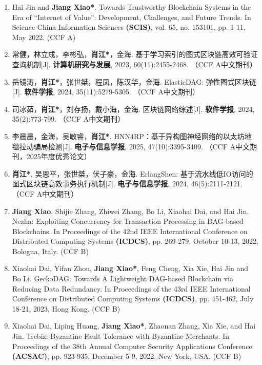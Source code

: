{\begin{enumerate}[itemsep=0pt, topsep=0pt, parsep=0pt]
    \item Hai Jin and \textbf{Jiang Xiao*}. Towards Trustworthy Blockchain Systems in the Era of ``Internet of Value'': Development, Challenges, and Future Trends. In Science China Information Sciences \textbf{(SCIS)}, vol. 65, no. 153101, pp. 1-11, May 2022. (CCF A)

    \item 常健，林立成，李彬弘，\textbf{肖江*}，金海. 基于学习索引的图式区块链高效可验证查询机制[J]. \textbf{计算机研究与发展}, 2023, 60(11):2455-2468. （CCF A中文期刊）

    \item 岳镜涛，\textbf{肖江*}，张世桀，程凤，陈汉华，金海. ElasticDAG: 弹性图式区块链[J]. \textbf{软件学报}, 2024, 35(11):5279-5305. （CCF A中文期刊）

    \item 司冰茹，\textbf{肖江*}，刘存扬，戴小海，金海. 区块链网络综述[J]. \textbf{软件学报}, 2024, 35(2):773-799. （CCF A中文期刊）

    \item 李晨晨，金海，吴敏睿，\textbf{肖江*}. HNN4RP：基于异构图神经网络的以太坊地毯拉动骗局检测[J]. \textbf{电子与信息学报}, 2025, 47(10):3395-3409. （CCF A中文期刊，2025年度优秀论文）

    \item \textbf{肖江*}, 吴恩平，张世桀，伏子豪，金海. ErlangShen: 基于流水线低IO访问的图式区块链高效事务执行机制[J]. \textbf{电子与信息学报}, 2024, 46(5):2111-2121. （CCF A中文期刊）

    \item \textbf{Jiang Xiao}, Shijie Zhang, Zhiwei Zhang, Bo Li, Xiaohai Dai, and Hai Jin. Nezha: Exploiting Concurrency for Transaction Processing in DAG-based Blockchains. In Proceedings of the 42nd IEEE International Conference on Distributed Computing Systems \textbf{(ICDCS)}, pp. 269-279, October 10-13, 2022, Bologna, Italy. (CCF B)

    \item Xiaohai Dai, Yifan Zhou, \textbf{Jiang Xiao*}, Feng Cheng, Xia Xie, Hai Jin and Bo Li. GeckoDAG: Towards A Lightweight DAG-based Blockchain via Reducing Data Redundancy. In Proceedings of the 43rd IEEE International Conference on Distributed Computing Systems \textbf{(ICDCS)}, pp. 451-462, July 18-21, 2023, Hong Kong. (CCF B)

    \item Xiaohai Dai, Liping Huang, \textbf{Jiang Xiao*}, Zhaonan Zhang, Xia Xie, and Hai Jin. Trebiz: Byzantine Fault Tolerance with Byzantine Merchants. In Proceedings of the 38th Annual Computer Security Applications Conference \textbf{(ACSAC)}, pp. 923-935, December 5-9, 2022, New York, USA. (CCF B)


\end{enumerate}}
